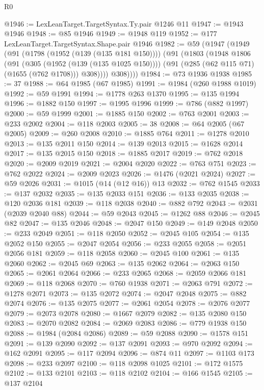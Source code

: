\begin{lexlean}{R0}
\begin{coremodule}
@1946 := LexLeanTarget.TargetSyntax.Ty.pair @1246 @11
@1947 := @1943 @1946
@1948 := @85 @1946
@1949 := @1948 @119
@1952 := @177 LexLeanTarget.TargetSyntax.Shape.pair @1946
@1982 := @59
    (@1947
      (@1949
        (@91
          (@1798 (@1952 (@139 (@135 @181 @150))))
          (@91
            (@1803
              (@1948
                @1806
                (@91
                  (@305 (@1952 (@139 (@135 @1025 @150))))
                  (@91 (@285 (@62 @115 @71) (@1655 (@762 @1708))) @308))))
            @308))))
@1984 := @73 @1936 @1938
@1985 := 37
@1988 := @64 @1985 (@67 @1985)
@1991 := @1984 (@260 @1988 @1019)
@1992 := @59 @1991
@1994 := @1778 @263 @1370
@1995 := @135 @1994
@1996 := @1882 @150
@1997 := @1995 @1996
@1999 := @786 (@882 @1997)
@2000 := @59 @1999
@2001 := @1885 @150
@2002 := @763 @2001
@2003 := @233 @2002
@2004 := @118 @2003
@2005 := 38
@2008 := @64 @2005 (@67 @2005)
@2009 := @260 @2008
@2010 := @1885 @764
@2011 := @1278 @2010
@2013 := @135 @2011 @150
@2014 := @139 @2013
@2015 := @1628 @2014
@2017 := @135 @2015 @150
@2018 := @1885 @2017
@2019 := @762 @2018
@2020 := @2009 @2019
@2021 := @2004 @2020
@2022 := @763 @751
@2023 := @762 @2022
@2024 := @2009 @2023
@2026 := @1476 (@2021 @2024)
@2027 := @59 @2026
@2031 := @1015 (@14 (@12 @16)) @13
@2032 := @762 @1545
@2033 := @137 @2032
@2035 := @135 @2033 @151
@2036 := @133 @2035
@2038 := @120 @2036 @181
@2039 := @118 @2038
@2040 := @882 @792
@2043 := @2031 (@2039 @2040 @88)
@2044 := @59 @2043
@2045 := @1262 @88
@2046 := @2045 @82
@2047 := @135 @2046
@2048 := @2047 @150
@2049 := @149 @2048
@2050 := @233 @2049
@2051 := @118 @2050
@2052 := @2045 @105
@2054 := @135 @2052 @150
@2055 := @2047 @2054
@2056 := @233 @2055
@2058 := @2051 @2056 @181
@2059 := @118 @2058
@2060 := @2045 @100
@2061 := @135 @2060
@2062 := @2045 @69
@2063 := @135 @2062
@2064 := @2063 @150
@2065 := @2061 @2064
@2066 := @233 @2065
@2068 := @2059 @2066 @181
@2069 := @118 @2068
@2070 := @760 @1938
@2071 := @2063 @791
@2072 := @1278 @2071
@2073 := @135 @2072
@2074 := @2047 @2048
@2075 := @882 @2074
@2076 := @135 @2075
@2077 := @2061 @2054
@2078 := @2076 @2077
@2079 := @2073 @2078
@2080 := @1667 @2079
@2082 := @135 @2080 @150
@2083 := @2070 @2082
@2084 := @2069 @2083
@2086 := @779 @1938 @150
@2088 := @1984 (@2084 @2086)
@2089 := @59 @2088
@2090 := @1578 @151
@2091 := @139 @2090
@2092 := @137 @2091
@2093 := @970 @2092
@2094 := @162 @2091
@2095 := @117 @2094
@2096 := @874 @11
@2097 := @1103 @173
@2098 := @233 @2097
@2100 := @118 @2098 @1025
@2101 := @172 @1575
@2102 := @133 @2101
@2103 := @118 @2102
@2104 := @166 @1545
@2105 := @137 @2104

\end{coremodule}
\end{lexlean}
